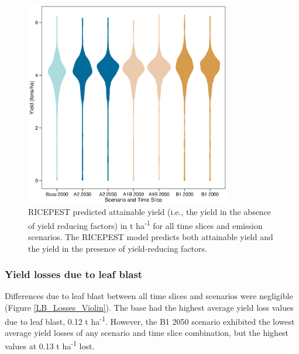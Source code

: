 \documentclass[preprint,review,12pt]{elsarticle}
\begin{document}
    \begin{figure}[H]
      \includegraphics[width = 90mm]{figures/Yield_Attainable_Violin}
      \caption{RICEPEST predicted attainable yield (i.e., the yield in the absence of yield reducing factors) in t ha\textsuperscript{-1} for all time slices and emission scenarios. The RICEPEST model predicts both attainable yield and the yield in the presence of yield-reducing factors.}
      \label{Yield_Attainable_Violin}
    \end{figure}
    
    \subsubsection{Yield losses due to leaf blast}
    Differences due to leaf blast between all time slices and scenarios were negligible (Figure \ref{LB_Losses_Violin}). The base had the highest average yield loss values due to leaf blast, 0.12 t ha\textsuperscript{-1}. However, the B1 2050 scenario exhibited the lowest average yield losses of any scenario and time slice combination, but the highest values at 0.13 t ha\textsuperscript{-1} lost.
    
\end{document}
